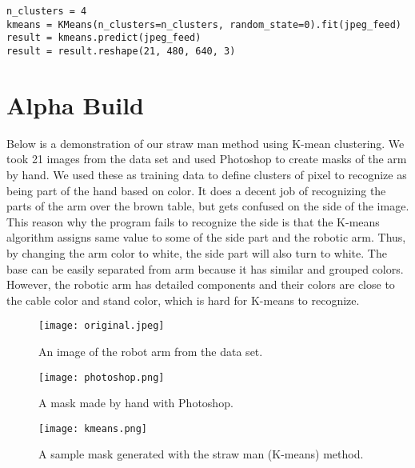 \documentclass[10pt,journal,compsoc, draftclsnofoot,onecolumn]{IEEEtran}
\begin{document}
\begin{lstlisting}
n_clusters = 4
kmeans = KMeans(n_clusters=n_clusters, random_state=0).fit(jpeg_feed)
result = kmeans.predict(jpeg_feed)
result = result.reshape(21, 480, 640, 3)
\end{lstlisting}

\section{Alpha Build}
Below is a demonstration of our straw man method using K-mean clustering. We took 21 images from the data set and used Photoshop to create masks of the arm by hand. We used these as training data to define clusters of pixel to recognize as being part of the hand based on color. It does a decent job of recognizing the parts of the arm over the brown table, but gets confused on the side of the image. \\

\noindent This reason why the program fails to recognize the side is that the K-means algorithm assigns same value to some of the side part and the robotic arm. Thus, by changing the arm color to white, the side part will also turn to white. The base can be easily separated from arm because it has similar and grouped colors. However, the robotic arm has detailed components and their colors are close to the cable color and stand color, which is hard for K-means to recognize.

\begin{figure}[H]
  \begin{center}
    \texttt{[image: original.jpeg]}
  \end{center}
  \caption{An image of the robot arm from the data set.}
\end{figure}

\begin{figure}[H]
 \begin{center}
    \texttt{[image: photoshop.png]}
 \end{center}
 \caption{A mask made by hand with Photoshop.}
\end{figure}


\begin{figure}[H]
  \begin{center}
    \texttt{[image: kmeans.png]}
  \end{center}
  \caption{A sample mask generated with the straw man (K-means) method.}
\end{figure}
\end{document}
